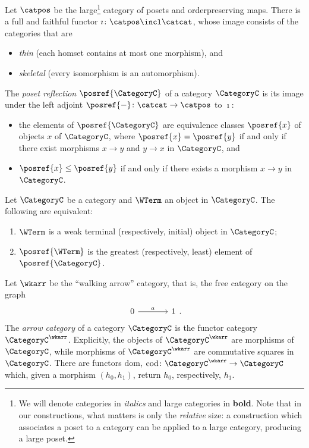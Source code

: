 \begin{definition} \label{def: poset reflection}
    Let $\catpos$ be the large\footnote{We will denote categories in \textit{italics} and large categories in \textbf{bold}. Note that in our constructions, what matters is only the \emph{relative} size: a construction which associates a poset to a category can be applied to a large category, producing a large poset.}
    category of posets and order\nbd preserving maps.
    There is a full and faithful functor $\imath\colon \catpos \incl \catcat$, whose image consists of the categories that are
    \begin{itemize}
        \item \emph{thin} (each hom\nbd set contains at most one morphism), and
        \item \emph{skeletal} (every isomorphism is an automorphism).
    \end{itemize}
    The \emph{poset reflection} $\posref{\CategoryC}$ of a category $\CategoryC$ is its image under the left adjoint $\posref{-}\colon \catcat \to \catpos$ to $\imath$:
    \begin{itemize}
        \item the elements of $\posref{\CategoryC}$ are equivalence classes $\posref{x}$ of objects $x$ of $\CategoryC$, where $\posref{x} = \posref{y}$ if and only if there exist morphisms $x \to y$ and $y \to x$ in $\CategoryC$, and
        \item $\posref{x} \leq \posref{y}$ if and only if there exists a morphism $x \to y$ in $\CategoryC$.
    \end{itemize}
\end{definition}
%
%
\begin{proposition}\label{prop: weak terminal is greatest in posref}
    Let $\CategoryC$ be a category and $\WTerm$ an object in $\CategoryC$.
    The following are equivalent:
    \begin{enumerate}[label=(\alph*)]
        \item $\WTerm$ is a weak terminal (respectively, initial) object in $\CategoryC$;
        \item $\posref{\WTerm}$ is the greatest (respectively, least) element of $\posref{\CategoryC}$.
    \end{enumerate}
\end{proposition}
%
%
%
\begin{definition}\label{def: arrow category}
    Let $\wkarr$ be the ``walking arrow'' category, that is, the free category on the graph
    \[\begin{tikzcd}[sep=scriptsize]
        0 && 1
        \arrow["a", from=1-1, to=1-3]
    \end{tikzcd}.\]
    The \emph{arrow category} of a category $\CategoryC$ is the functor category $\CategoryC^\wkarr$.
    Explicitly, the objects of $\CategoryC^\wkarr$ are morphisms of $\CategoryC$, while morphisms of $\CategoryC^\wkarr$ are commutative squares in $\CategoryC$.
    There are functors $\mathrm{dom}$, $\mathrm{cod}\colon \CategoryC^\wkarr \to \CategoryC$ which, given a morphism $(h_0, h_1)$, return $h_0$, respectively, $h_1$.
\end{definition}
